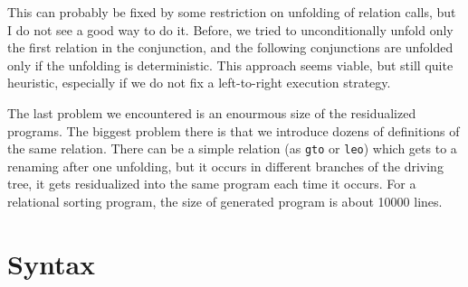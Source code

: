 \documentclass{llncs}
\begin{document}
This can probably be fixed by some restriction on unfolding of relation calls, but I do not see a good way to do it. Before, we tried to unconditionally unfold only the first relation in the conjunction, and the following conjunctions are unfolded only if the unfolding is deterministic. This approach seems viable, but still quite heuristic, especially if we do not fix a left-to-right execution strategy. 


The last problem we encountered is an enourmous size of the residualized programs. The biggest problem there is that we introduce dozens of definitions of the same relation. There can be a simple relation (as \verb!gto! or \verb!leo!) which gets to a renaming after one unfolding, but it occurs in different branches of the driving tree, it gets residualized into the same program each time it occurs. For a relational sorting program, the size of generated program is about 10000 lines. 

\newpage

\section{Syntax}
\end{document}
